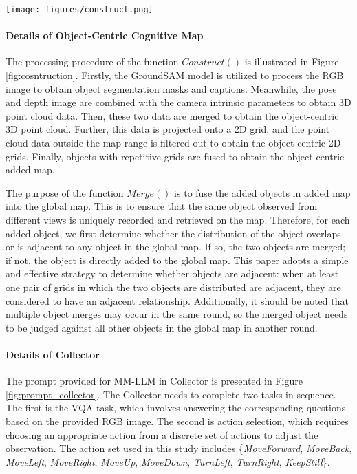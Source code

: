 \begin{figure*}[!htb]
\centering
    \texttt{[image: figures/construct.png]}
\caption{The workflow of the construction of the added map.}
\label{fig:cosntruction}
\end{figure*}

\paragraph{Details of Object-Centric Cognitive Map}
\label{occm}

The processing procedure of the function $ Construct()$ is illustrated in Figure \ref{fig:cosntruction}. Firstly, the GroundSAM model is utilized to process the RGB image to obtain object segmentation masks and captions. Meanwhile, the pose and depth image are combined with the camera intrinsic parameters to obtain 3D point cloud data. Then, these two data are merged to obtain the object-centric 3D point cloud. Further, this data is projected onto a 2D grid, and the point cloud data outside the map range is filtered out to obtain the object-centric 2D grids. Finally, objects with repetitive grids are fused to obtain the object-centric added map.

The purpose of the function $ Merge()$ is to fuse the added objects in added map into the global map. This is to ensure that the same object observed from different views is uniquely recorded and retrieved on the map. Therefore, for each added object, we first determine whether the distribution of the object overlaps or is adjacent to any object in the global map. If so, the two objects are merged; if not, the object is directly added to the global map. This paper adopts a simple and effective strategy to determine whether objects are adjacent: when at least one pair of grids in which the two objects are distributed are adjacent, they are considered to have an adjacent relationship. Additionally, it should be noted that multiple object merges may occur in the same round, so the merged object needs to be judged against all other objects in the global map in another round.

\paragraph{Details of Collector}
\label{a_collector}
The prompt provided for MM-LLM in Collector is presented in Figure \ref{fig:prompt_collector}. The Collector needs to complete two tasks in sequence. The first is the VQA task, which involves answering the corresponding questions based on the provided RGB image. The second is action selection, which requires choosing an appropriate action from a discrete set of actions to adjust the observation. The action set used in this study includes \{\textit{MoveForward}, \textit{MoveBack}, \textit{MoveLeft}, \textit{MoveRight}, \textit{MoveUp}, \textit{MoveDown}, \textit{TurnLeft}, \textit{TurnRight}, \textit{KeepStill}\}.

